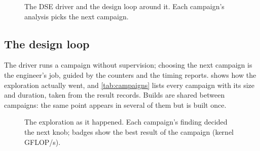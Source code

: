 \begin{figure}[t]
  \centering
  \resizebox{0.95\linewidth}{!}{}
  \caption{The DSE driver and the design loop around it. Each campaign's analysis picks the next campaign.}
  \label{fig:dse}
\end{figure}

\subsection{The design loop}
The driver runs a campaign without supervision; choosing the next campaign is the engineer's job, guided by the
counters and the timing reports.  shows how the exploration actually went, and
\cref{tab:campaigns} lists every campaign with its size and duration, taken from the result records. Builds are shared
between campaigns: the same point appears in several of them but is built once.

\begin{figure}[t]
  \centering
  \resizebox{\linewidth}{!}{}
  \caption{The exploration as it happened. Each campaign's finding decided the next knob; badges show the best
    result of the campaign (kernel GFLOP/s).}
  \label{fig:journey}
\end{figure}

